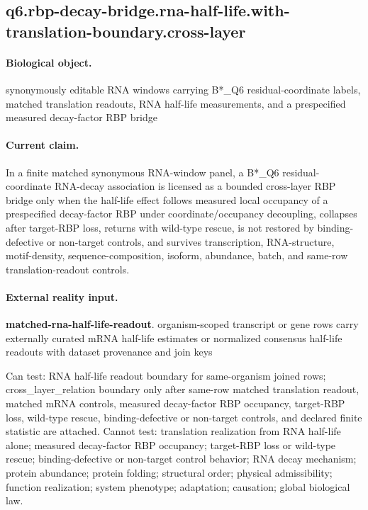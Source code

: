 \subsection{q6.rbp-decay-bridge.rna-half-life.with-translation-boundary.cross-layer}

\paragraph{Biological object.} synonymously editable RNA windows carrying B*\_Q6 residual-coordinate labels, matched translation readouts, RNA half-life measurements, and a prespecified measured decay-factor RBP bridge

\paragraph{Current claim.} In a finite matched synonymous RNA-window panel, a B*\_Q6 residual-coordinate RNA-decay association is licensed as a bounded cross-layer RBP bridge only when the half-life effect follows measured local occupancy of a prespecified decay-factor RBP under coordinate/occupancy decoupling, collapses after target-RBP loss, returns with wild-type rescue, is not restored by binding-defective or non-target controls, and survives transcription, RNA-structure, motif-density, sequence-composition, isoform, abundance, batch, and same-row translation-readout controls.

\paragraph{External reality input.}
\textbf{matched-rna-half-life-readout}. organism-scoped transcript or gene rows carry externally curated mRNA half-life estimates or normalized consensus half-life readouts with dataset provenance and join keys

Can test: RNA half-life readout boundary for same-organism joined rows; cross\_layer\_relation boundary only after same-row matched translation readout, matched mRNA controls, measured decay-factor RBP occupancy, target-RBP loss, wild-type rescue, binding-defective or non-target controls, and declared finite statistic are attached. Cannot test: translation realization from RNA half-life alone; measured decay-factor RBP occupancy; target-RBP loss or wild-type rescue; binding-defective or non-target control behavior; RNA decay mechanism; protein abundance; protein folding; structural order; physical admissibility; function realization; system phenotype; adaptation; causation; global biological law.

